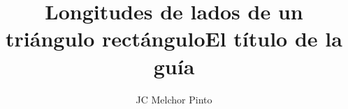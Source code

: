 \documentclass[12pt,addpoints,answers]{guia}
\title{Longitudes de lados de un triángulo rectángulo}
\title{El título de la guía}
\author{JC Melchor Pinto}
\begin{document}
\pagestyle{headandfoot}

\INFO
\begin{multicols}{2}
    
    
    \columnbreak
    
\end{multicols}
\begin{questions}
    \questionboxed[10]{}
    \questionboxed[10]{}
    \questionboxed[10]{}
    \questionboxed[10]{}
    \questionboxed[10]{}
    \questionboxed[10]{}
    \questionboxed[10]{}
    \questionboxed[10]{}
    \questionboxed[10]{}
    \questionboxed[10]{}
\end{questions}
\end{document}

